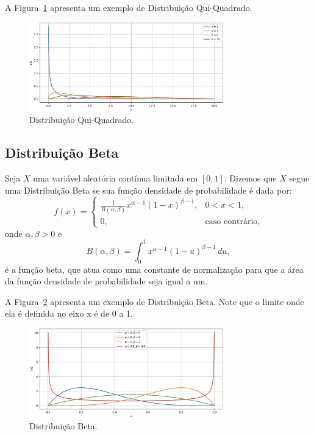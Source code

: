\documentclass{article}
\begin{document}
A Figura~\ref{fig:dist_cont_quiquadrado} apresenta um exemplo de Distribuição Qui-Quadrado.

\begin{figure}[H]
    \centering    \includegraphics[width=0.75\textwidth]{figuras/dist_cont_quiquadrado.png}
    \caption{Distribuição Qui-Quadrado.}
    \label{fig:dist_cont_quiquadrado}
\end{figure}

\subsection{Distribuição Beta}
Seja $X$ uma variável aleatória contínua limitada em $[0,1]$. Dizemos que $X$ segue uma Distribuição Beta se sua função densidade de probabilidade é dada por:
    $$
    f(x) =
    \begin{cases}
    \frac{1}{B(\alpha, \beta)} x^{\alpha - 1} (1 - x)^{\beta - 1}, & 0 < x < 1, \\
    0, & \text{caso contrário},
    \end{cases}
    $$
onde $\alpha, \beta > 0$ e
    $$
    B(\alpha, \beta) = \int_0^1 x^{\alpha - 1} (1 - u)^{\beta - 1} \, du,
    $$
é a função beta, que atua como uma constante de normalização para que a área da função densidade de probabilidade seja igual a um.

A Figura~\ref{fig:dist_cont_beta} apresenta um exemplo de Distribuição Beta. Note que o limite onde ela é definida no eixo x é de 0 a 1.

\begin{figure}[H]
    \centering    \includegraphics[width=0.75\textwidth]{figuras/dist_cont_beta.png}
    \caption{Distribuição Beta.}
    \label{fig:dist_cont_beta}
\end{figure}
\end{document}
